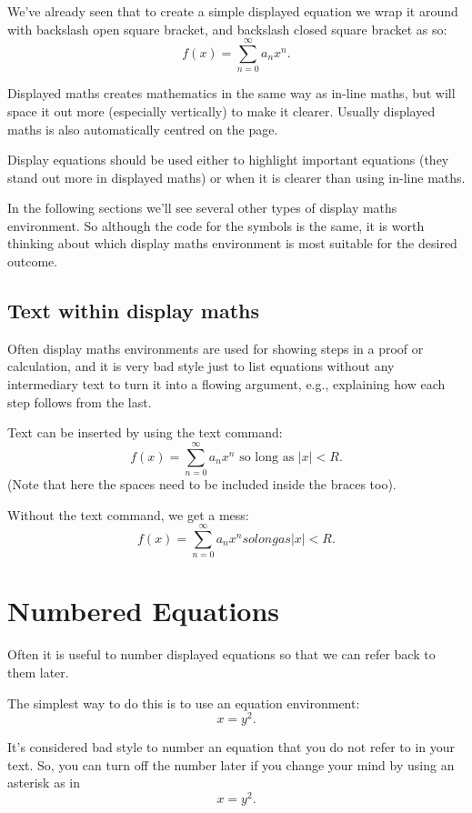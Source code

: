 \documentclass[a4paper,11pt]{article}
\begin{document}
We've already seen that to create a simple displayed equation we wrap it around with backslash open square bracket, and backslash closed square bracket as so:
\[
f(x) = \sum_{n=0}^{\infty} a_n x^n.
\]

Displayed maths creates mathematics in the same way as in-line maths, but will space it out more (especially vertically) to make it clearer. Usually displayed maths is also automatically centred on the page. 

Display equations should be used either to highlight important equations (they stand out more in displayed maths) or when it is clearer than using in-line maths.

In the following sections we'll see several other types of display maths environment. So although the code for the symbols is the same, it is worth thinking about which display maths environment is most suitable for the desired outcome.

\subsection{Text within display maths}

Often display maths environments are used for showing steps in a proof or calculation, and it is very bad style just to list equations without any intermediary text to turn it into a flowing argument, e.g., explaining how each step follows from the last.

Text can be inserted by using the text command:
\[
f(x) = \sum_{n=0}^{\infty} a_n x^n \text{ so long as } |x|<R.
\]
(Note that here the spaces need to be included inside the braces too).

Without the text command, we get a mess:
\[
f(x) = \sum_{n=0}^{\infty} a_n x^n  so long as  |x|<R.
\]

\section{Numbered Equations}

Often it is useful to number displayed equations so that we can refer back to them later.

The simplest way to do this is to use an equation environment:
\begin{equation}
x=y^2.
\end{equation}

It's considered bad style to number an equation that you do not refer to in your text. So, you can turn off the number later if you change your mind by using an asterisk as in
\begin{equation*}
x=y^2.
\end{equation*}
\end{document}
